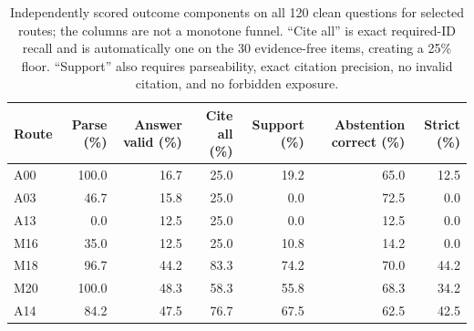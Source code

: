 \begin{table}[t]
\caption{Independently scored outcome components on all 120 clean questions for selected routes; the columns are not a monotone funnel. ``Cite all'' is exact required-ID recall and is automatically one on the 30 evidence-free items, creating a 25\% floor. ``Support'' also requires parseability, exact citation precision, no invalid citation, and no forbidden exposure.}
\label{tab:failure-decomposition}
\centering
\small
\begin{tabular}{@{}lrrrrrr@{}}
\toprule
Route & Parse (\%) & Answer valid (\%) & Cite all (\%) & Support (\%) & Abstention correct (\%) & Strict (\%) \\
\midrule
A00 & 100.0 & 16.7 & 25.0 & 19.2 & 65.0 & 12.5 \\
A03 & 46.7 & 15.8 & 25.0 & 0.0 & 72.5 & 0.0 \\
A13 & 0.0 & 12.5 & 25.0 & 0.0 & 12.5 & 0.0 \\
M16 & 35.0 & 12.5 & 25.0 & 10.8 & 14.2 & 0.0 \\
M18 & 96.7 & 44.2 & 83.3 & 74.2 & 70.0 & 44.2 \\
M20 & 100.0 & 48.3 & 58.3 & 55.8 & 68.3 & 34.2 \\
A14 & 84.2 & 47.5 & 76.7 & 67.5 & 62.5 & 42.5 \\
\bottomrule
\end{tabular}
\end{table}
